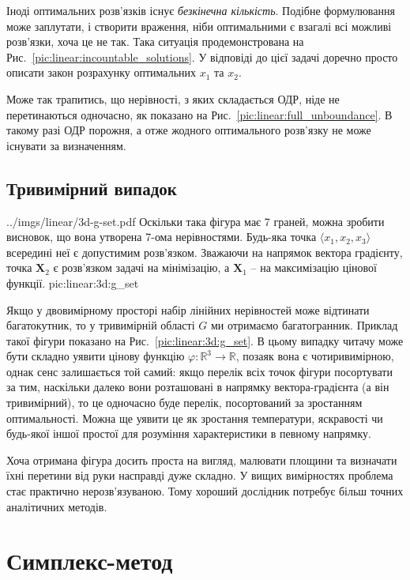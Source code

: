 \documentclass[\main/book.tex]{subfiles}
\begin{document}
Іноді оптимальних розв'язків існує \textit{безкінечна кількість}. Подібне формулювання може заплутати, і створити враження, ніби оптимальними є взагалі всі можливі розв'язки, хоча це не так. Така ситуація продемонстрована на Рис.~\ref{pic:linear:incountable_solutions}. У відповіді до цієї задачі доречно просто описати закон розрахунку оптимальних $x_1$ та $x_2$.

Може так трапитись, що нерівності, з яких складається ОДР, ніде не перетинаються одночасно, як показано на Рис.~\ref{pic:linear:full_unboundance}. В такому разі ОДР порожня, а отже жодного оптимального розв'язку не може існувати за визначенням.

\subsection{Тривимірний випадок}

\illustration
 {../imgs/linear/3d-g-set.pdf}
 {Оскільки така фігура має 7 граней, можна зробити висновок, що вона утворена 7-ома нерівностями. Будь-яка точка $\langle x_1, x_2, x_3 \rangle$ всередині неї є допустимим розв'язком. Зважаючи на напрямок вектора градієнту, точка $\mathbf{X}_2$ є розв'язком задачі на мінімізацію, а $\mathbf{X}_1$ -- на максимізацію цінової функції.}
 {pic:linear:3d:g_set}

Якщо у двовимірному просторі набір лінійних нерівностей може відтинати багатокутник, то у тривимірній області $G$ ми отримаємо багатогранник. Приклад такої фігури показано на Рис.~\ref{pic:linear:3d:g_set}. В цьому випадку читачу може бути складно уявити цінову функцію ${\varphi: \mathbb{R}^3 \rightarrow \mathbb{R}}$, позаяк вона є чотиривимірною, однак сенс залишається той самий: якщо перелік всіх точок фігури посортувати за тим, наскільки \flqq{}далеко\frqq{} вони розташовані в напрямку вектора-градієнта (а він тривимірний), то це одночасно буде перелік, посортований за зростанням оптимальності. Можна ще уявити це як зростання температури, яскравості чи будь-якої іншої простої для розуміння характеристики в певному напрямку.
 
Хоча отримана фігура досить проста на вигляд, малювати площини та визначати їхні перетини від руки насправді дуже складно. У вищих вимірностях проблема стає практично нерозв'язуваною. Тому хороший дослідник потребує більш точних аналітичних методів.

\section{Симплекс-метод}
\label{section:linear:simplex}
\end{document}
